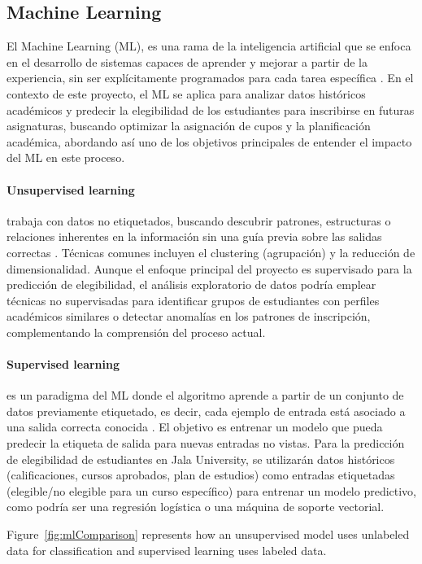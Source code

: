 \subsection{Machine Learning}
El Machine Learning (ML), es una rama de la inteligencia artificial que se enfoca en el desarrollo de sistemas capaces de aprender y mejorar a partir de la experiencia, sin ser explícitamente programados para cada tarea específica \parencite{Samuel1959}.
En el contexto de este proyecto, el ML se aplica para analizar datos históricos académicos y predecir la elegibilidad de los estudiantes para inscribirse en futuras asignaturas, buscando optimizar la asignación de cupos y la planificación académica, abordando así uno de los objetivos principales de entender el impacto del ML en este proceso.

\paragraph{Unsupervised learning} trabaja con datos no etiquetados, buscando descubrir patrones, estructuras o relaciones inherentes en la información sin una guía previa sobre las salidas correctas \parencite{Hastie2009}.
Técnicas comunes incluyen el clustering (agrupación) y la reducción de dimensionalidad.
Aunque el enfoque principal del proyecto es supervisado para la predicción de elegibilidad, el análisis exploratorio de datos podría emplear técnicas no supervisadas para identificar grupos de estudiantes con perfiles académicos similares o detectar anomalías en los patrones de inscripción, complementando la comprensión del proceso actual.

\paragraph{Supervised learning} es un paradigma del ML donde el algoritmo aprende a partir de un conjunto de datos previamente etiquetado, es decir, cada ejemplo de entrada está asociado a una salida correcta conocida \parencite{Bishop2006}.
El objetivo es entrenar un modelo que pueda predecir la etiqueta de salida para nuevas entradas no vistas.
Para la predicción de elegibilidad de estudiantes en Jala University, se utilizarán datos históricos (calificaciones, cursos aprobados, plan de estudios) como entradas etiquetadas (elegible/no elegible para un curso específico) para entrenar un modelo predictivo, como podría ser una regresión logística o una máquina de soporte vectorial.

Figure~\ref{fig:mlComparison} represents how an unsupervised model uses unlabeled data for classification and supervised learning uses labeled data.

